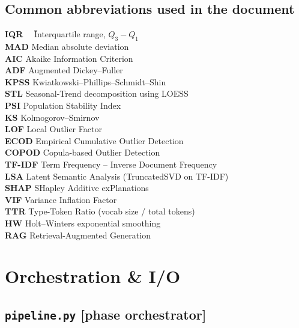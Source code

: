 \documentclass[11pt,a4paper]{article}
\begin{document}
\subsection{Common abbreviations used in the document}

\begin{tabbing}
\textbf{IQR}~~ \= Interquartile range, $Q_3 - Q_1$\\
\textbf{MAD}    \> Median absolute deviation\\
\textbf{AIC}    \> Akaike Information Criterion\\
\textbf{ADF}    \> Augmented Dickey--Fuller\\
\textbf{KPSS}   \> Kwiatkowski--Phillips--Schmidt--Shin\\
\textbf{STL}    \> Seasonal-Trend decomposition using LOESS\\
\textbf{PSI}    \> Population Stability Index\\
\textbf{KS}     \> Kolmogorov--Smirnov\\
\textbf{LOF}    \> Local Outlier Factor\\
\textbf{ECOD}   \> Empirical Cumulative Outlier Detection\\
\textbf{COPOD}  \> Copula-based Outlier Detection\\
\textbf{TF-IDF} \> Term Frequency -- Inverse Document Frequency\\
\textbf{LSA}    \> Latent Semantic Analysis (TruncatedSVD on TF-IDF)\\
\textbf{SHAP}   \> SHapley Additive exPlanations\\
\textbf{VIF}    \> Variance Inflation Factor\\
\textbf{TTR}    \> Type-Token Ratio (vocab size / total tokens)\\
\textbf{HW}     \> Holt--Winters exponential smoothing\\
\textbf{RAG}    \> Retrieval-Augmented Generation
\end{tabbing}

\newpage

\section{Orchestration \& I/O}

\subsection{\texttt{\textbf{pipeline.py}} \textcolor{tealac}{\small\textsf{[phase orchestrator]}}}
\end{document}
